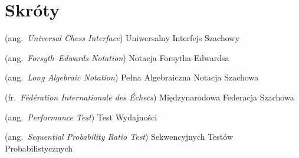 %
\chapter*{Skróty}
\label{sec:skroty}
\noindent\vspace{-\topsep-\partopsep-\parsep} %
\begin{description}[labelwidth=*]
  \item [UCI] (ang.\ \emph{Universal Chess Interface}) Uniwersalny Interfejs Szachowy
  \item [FEN] (ang.\ \emph{Forsyth–Edwards Notation}) Notacja Forsytha-Edwardsa
  \item [LAN] (ang.\ \emph{Long Algebraic Notation}) Pełna Algebraiczna Notacja Szachowa
  \item [FIDE] (fr.\ \emph{Fédération Internationale des Échecs}) Międzynarodowa Federacja Szachowa
  \item [Perft] (ang.\ \emph{Performance Test}) Test Wydajności
  \item [SPRT] (ang.\ \emph{Sequential Probability Ratio Test}) Sekwencyjnych Testów Probabilistycznych
\end{description}


